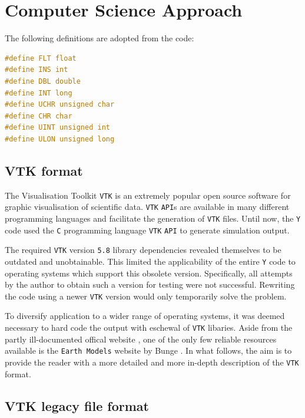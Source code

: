 \section{Computer Science Approach}
\label{sec:ComputerScienceApproach}

The following definitions are adopted from the code:

\begin{lstlisting}[language=C, caption=Data type definitions, label=lst:definitions]
#define FLT float
#define INS int
#define DBL double
#define INT long
#define UCHR unsigned char
#define CHR char
#define UINT unsigned int
#define ULON unsigned long
\end{lstlisting}

\subsection{VTK format}
\label{subsec:VTKformat}

The Visualisation Toolkit \texttt{VTK} \cite{Kit} is an extremely popular open source software for graphic visualisation of scientific data. \texttt{VTK} \texttt{API}s are available in many different programming languages and facilitate the generation of \texttt{VTK} files. Until now, the \texttt{Y} code used the \texttt{C} programming language \texttt{VTK} \texttt{API} to generate simulation output. 

\bigbreak
The required \texttt{VTK} version \texttt{5.8} library dependencies revealed themselves to be outdated and unobtainable. This limited the applicability of the entire \texttt{Y} code to operating systems which support this obsolete version. Specifically, all attempts by the author to obtain such a version for testing were not successful. Rewriting the code using a newer \texttt{VTK} version would only temporarily solve the problem.

\bigbreak
To diversify application to a wider range of operating systems, it was deemed necessary to hard code the output with eschewal of \texttt{VTK} libaries. Aside from the partly ill-documented offical website \cite{Kit}, one of the only few reliable resources available is the \texttt{Earth Models} website by Bunge \cite{Bun09}. In what follows, the aim is to provide the reader with a more detailed and more in-depth description of the \texttt{VTK} format. 

\subsection{VTK legacy file format}
\label{subsec:VTKlegacyfileformat}

